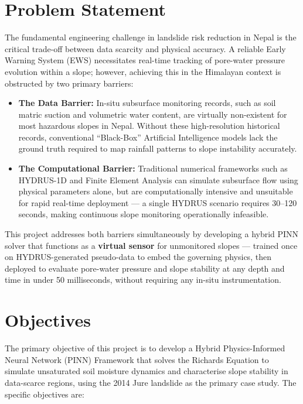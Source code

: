 \documentclass[12pt]{report}
\begin{document}
\section{Problem Statement}

The fundamental engineering challenge in landslide risk reduction in
Nepal is the critical trade-off between data scarcity and physical
accuracy. A reliable Early Warning System (EWS) necessitates real-time
tracking of pore-water pressure evolution within a slope; however,
achieving this in the Himalayan context is obstructed by two primary
barriers:

\begin{itemize}

    \item \textbf{The Data Barrier:} In-situ subsurface monitoring
    records, such as soil matric suction and volumetric water content,
    are virtually non-existent for most hazardous slopes in Nepal.
    Without these high-resolution historical records, conventional
    ``Black-Box'' Artificial Intelligence models lack the ground truth
    required to map rainfall patterns to slope instability accurately.

    \item \textbf{The Computational Barrier:} Traditional numerical
    frameworks such as HYDRUS-1D and Finite Element Analysis can
    simulate subsurface flow using physical parameters alone, but are
    computationally intensive and unsuitable for rapid real-time
    deployment — a single HYDRUS scenario requires 30--120 seconds,
    making continuous slope monitoring operationally infeasible.

\end{itemize}

This project addresses both barriers simultaneously by developing a
hybrid PINN solver that functions as a \textbf{virtual sensor} for
unmonitored slopes — trained once on HYDRUS-generated pseudo-data to
embed the governing physics, then deployed to evaluate pore-water
pressure and slope stability at any depth and time in under 50
milliseconds, without requiring any in-situ instrumentation.
\section{Objectives}

The primary objective of this project is to develop a Hybrid
Physics-Informed Neural Network (PINN) Framework that solves the
Richards Equation to simulate unsaturated soil moisture dynamics and
characterise slope stability in data-scarce regions, using the 2014
Jure landslide as the primary case study. The specific objectives are:
\end{document}
